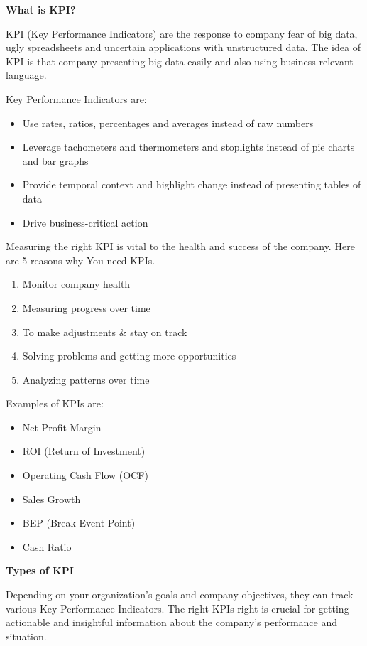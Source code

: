 \documentclass[]{book}
\providecommand{\tightlist}{%
  \setlength{\itemsep}{0pt}\setlength{\parskip}{0pt}}
\begin{document}
\textbf{What is KPI? }

KPI (Key Performance Indicators) are the response to company fear of big
data, ugly spreadsheets and uncertain applications with unstructured
data. The idea of KPI is that company presenting big data easily and
also using business relevant language.

Key Performance Indicators are:

\begin{itemize}
\tightlist
\item
  Use rates, ratios, percentages and averages instead of raw numbers
\item
  Leverage tachometers and thermometers and stoplights instead of pie
  charts and bar graphs
\item
  Provide temporal context and highlight change instead of presenting
  tables of data
\item
  Drive business-critical action
\end{itemize}

Measuring the right KPI is vital to the health and success of the
company. Here are 5 reasons why You need KPIs.

\begin{enumerate}
\def\labelenumi{\arabic{enumi}.}
\tightlist
\item
  Monitor company health
\item
  Measuring progress over time
\item
  To make adjustments \& stay on track
\item
  Solving problems and getting more opportunities
\item
  Analyzing patterns over time
\end{enumerate}

Examples of KPIs are:

\begin{itemize}
\tightlist
\item
  Net Profit Margin
\item
  ROI (Return of Investment)
\item
  Operating Cash Flow (OCF)
\item
  Sales Growth
\item
  BEP (Break Event Point)
\item
  Cash Ratio
\end{itemize}

\textbf{Types of KPI }

Depending on your organization's goals and company objectives, they can
track various Key Performance Indicators. The right KPIs right is
crucial for getting actionable and insightful information about the
company's performance and situation.
\end{document}
